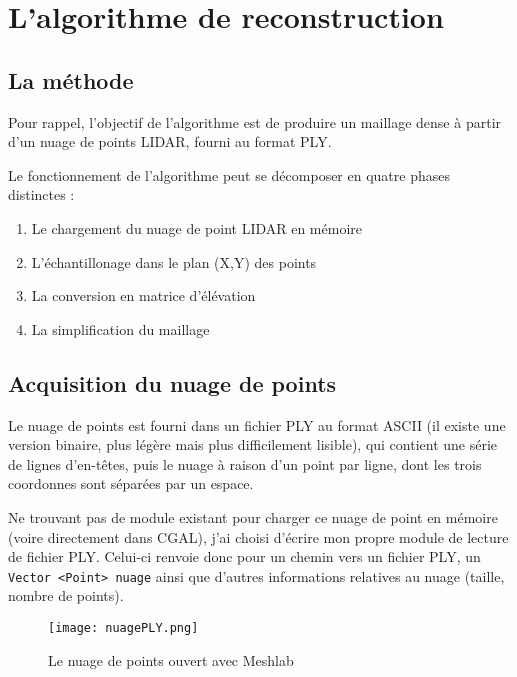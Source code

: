 \newpage
\section{L'algorithme de reconstruction}

\subsection{La méthode}

Pour rappel, l'objectif de l'algorithme est de produire un maillage dense à partir d'un nuage de points LIDAR, fourni au format PLY.

Le fonctionnement de l'algorithme peut se décomposer en quatre phases distinctes :
\begin{enumerate}
 \item Le chargement du nuage de point LIDAR en mémoire
 \item L'échantillonage dans le plan (X,Y) des points
 \item La conversion en matrice d'élévation
 \item La simplification du maillage
\end{enumerate}



\subsection{Acquisition du nuage de points}
Le nuage de points est fourni dans un fichier PLY au format ASCII (il existe une version binaire, plus légère mais plus difficilement lisible), qui contient une série de lignes d'en-têtes, puis le nuage à raison d'un point par ligne, dont les trois coordonnes sont séparées par un espace.

Ne trouvant pas de module existant pour charger ce nuage de point en mémoire (voire directement dans CGAL), j'ai choisi d'écrire mon propre module de lecture de fichier PLY.
Celui-ci renvoie donc pour un chemin vers un fichier PLY, un \texttt{Vector <Point> nuage} ainsi que d'autres informations relatives au nuage (taille, nombre de points).
\begin{figure}[H]
  \centering
   \texttt{[image: nuagePLY.png]}
   \caption{Le nuage de points ouvert avec Meshlab}
   \label{nuagePLY}
\end{figure}


